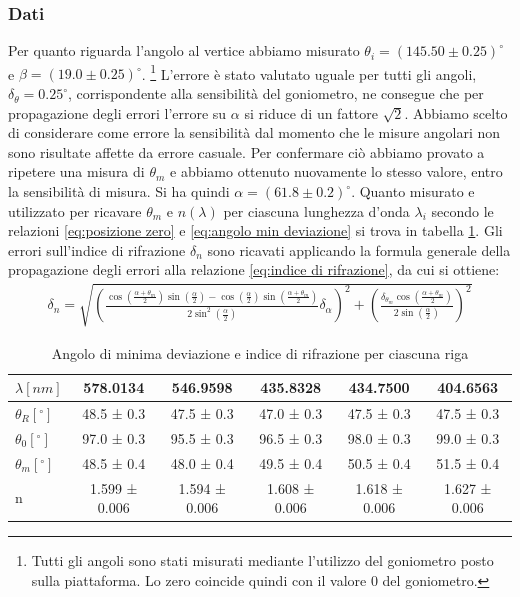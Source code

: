 \documentclass[a4paper]{article}
\begin{document}
\subsubsection{Dati}
Per quanto riguarda l'angolo al vertice abbiamo misurato $\theta_i = (145.50\pm0.25)^\circ$ e $\beta=(19.0\pm0.25)^\circ$. \footnote{Tutti gli angoli sono stati misurati mediante l'utilizzo del goniometro posto sulla piattaforma. Lo zero coincide quindi con il valore $0$ del goniometro.} L'errore è stato valutato uguale per tutti gli angoli, $\delta_{\theta}=0.25^\circ$, corrispondente alla sensibilità del goniometro, ne consegue che per propagazione degli errori l'errore su $\alpha$ si riduce di un fattore $\sqrt{2}$. Abbiamo scelto di considerare come errore la sensibilità dal momento che le misure angolari non sono risultate affette da errore casuale. Per confermare ciò abbiamo provato a ripetere una misura di $\theta_m$ e abbiamo ottenuto nuovamente lo stesso valore, entro la sensibilità di misura. Si ha quindi $\alpha = (61.8 \pm 0.2)^\circ$. 
Quanto misurato e utilizzato per ricavare $\theta_m$ e $n(\lambda)$ per ciascuna lunghezza d'onda $\lambda_i$ secondo le relazioni \ref{eq:posizione zero} e \ref{eq:angolo min deviazione} si trova in tabella \ref{tab:indice di rifrazione e angoli}. Gli errori sull'indice di rifrazione $\delta_n$ sono ricavati applicando la formula generale della propagazione degli errori alla relazione \ref{eq:indice di rifrazione}, da cui si ottiene:
\begin{align}
    \delta_n = \sqrt{\left(\frac{\cos(\frac{\alpha+\theta_m}{2})\sin(\frac{\alpha}{2})-\cos(\frac{\alpha}{2})\sin(\frac{\alpha+\theta_m}{2})}{2\sin^2(\frac{\alpha}{2})}\delta_{\alpha}\right)^2+\left(\frac{\delta_{\theta_m}\cos(\frac{\alpha+\theta_m}{2})}{2\sin(\frac{\alpha}{2})}\right)^2}
\end{align}

\begin{table}[htbp]
\centering
\begin{tabular}{|l|ccccc|}
\hline
$\lambda [nm]$ & 578.0134 & 546.9598 & 435.8328 & 434.7500 & 404.6563 \\\hline
$\theta_R [^\circ]$ & 48.5 ± 0.3 & 47.5 ± 0.3 & 47.0 ± 0.3 & 47.5 ± 0.3 & 47.5 ± 0.3 \\\hline
$\theta_0 [^\circ]$ & 97.0 ± 0.3 & 95.5 ± 0.3 & 96.5 ± 0.3 & 98.0 ± 0.3 & 99.0 ± 0.3 \\\hline
$\theta_m [^\circ]$ & 48.5 ± 0.4 & 48.0 ± 0.4 & 49.5 ± 0.4 & 50.5 ± 0.4 & 51.5 ± 0.4 \\\hline
n & 1.599 ± 0.006 & 1.594 ± 0.006 & 1.608 ± 0.006 & 1.618 ± 0.006 & 1.627 ± 0.006 \\\hline
\end{tabular}
\caption{Angolo di minima deviazione e indice di rifrazione per ciascuna riga}
\label{tab:indice di rifrazione e angoli}
\end{table}
\end{document}
